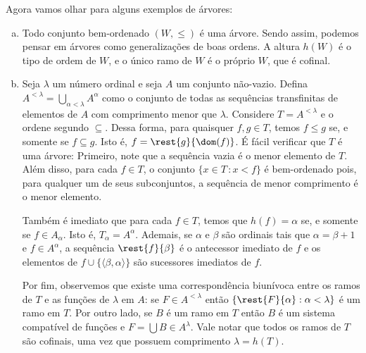 \documentclass[a4paper]{article}
\theoremstyle{plain}\newtheorem{teo}{Teorema}[section]
\theoremstyle{plain}\newtheorem{prop}[teo]{Proposição}
\theoremstyle{plain}\newtheorem{lem}[teo]{Lema}
\theoremstyle{plain}\newtheorem{cor}[teo]{Corolário}
\theoremstyle{definition}\newtheorem{defi}[teo]{Definição}
\theoremstyle{remark}\newtheorem{rem}[teo]{Observação}
\theoremstyle{definition}\newtheorem{example}[teo]{Exemplo}
\theoremstyle{remark}\newtheorem{step}{\bf Step}
\begin{document}
  Agora vamos olhar para alguns exemplos de árvores:
  \begin{exemplo}\hfill
    \begin{enumerate}[(a)]
    \item Todo conjunto bem-ordenado \((W,\leq)\) é uma árvore. Sendo assim,
      podemos pensar em árvores como generalizações de boas ordens. A altura
      \(h(W)\) é o tipo de ordem de \(W\), e o único ramo de \(W\) é o próprio
      \(W\), que é cofinal.
    \item Seja \(\lambda\) um número ordinal e seja \(A\) um conjunto não-vazio.
      Defina \(A^{< \lambda}=\bigcup_{\alpha < \lambda} A^\alpha\) como o
      conjunto de todas as sequências transfinitas de elementos de \(A\) com
      comprimento menor que \(\lambda\). Considere \(T=A^{< \lambda}\) e o
      ordene segundo \(\subseteq\). Dessa forma, para quaisquer \(f,g\in T\),
      temos \(f\leq g\) se, e somente se \(f\subseteq g\).
      Isto é, \(f=\rest{g}{\dom(f)}\). É fácil verificar que \(T\) é uma árvore:
      Primeiro, note que a sequência vazia é o menor elemento de \(T\). Além
      disso, para cada \(f\in T\), o conjunto \(\{x\in T\,\colon x < f\}\) é
      bem-ordenado pois, para qualquer um de seus subconjuntos, a sequência de
      menor comprimento é o menor elemento.

      Também é imediato que para cada \(f\in T\),
      temos que \(h(f)=\alpha\) se, e somente se \( f\in A_\alpha\). Isto é,
      \(T_\alpha =A^\alpha\). Ademais, se \(\alpha\) e \(\beta\) são ordinais
      tais que \(\alpha =\beta +1\) e \(f\in A^\alpha\), a sequência
      \(\rest{f}{\beta}\) é o antecessor imediato de
      \(f\) e os elementos de \(f\cup \{\langle \beta ,\alpha \rangle\}\) são
      sucessores imediatos de \(f\).

      Por fim, observemos que existe uma  correspondência biunívoca entre os
      ramos de \(T\) e as funções de \(\lambda\) em \(A\):
      se \(F\in A^{< \lambda}\) então \(\{{\rest{F}{\alpha} : \alpha <\lambda}\}\) é
      um ramo em \(T\). Por outro lado, se \(B\) é um ramo em
      \(T\) então \(B\) é um sistema compatível de funções
      e \(F=\bigcup B\in A^\lambda\). Vale notar que todos os ramos de \(T\) são
      cofinais, uma vez que possuem comprimento \(\lambda=h(T)\).
      

\end{enumerate}
\end{exemplo}
\end{document}
